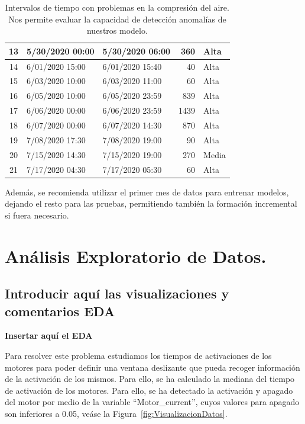 \documentclass[12pt,letterpaper]{article}
\begin{document}
\begin{table}[!ht]
\begin{tabular}{|c|l|l|r|l|}
13           & 5/30/2020 00:00          & 5/30/2020 06:00           & 360                & Alta              \\ \hline
14           & 6/01/2020 15:00          & 6/01/2020 15:40           & 40                 & Alta              \\ \hline
15           & 6/03/2020 10:00          & 6/03/2020 11:00           & 60                 & Alta              \\ \hline
16           & 6/05/2020 10:00          & 6/05/2020 23:59           & 839                & Alta              \\ \hline
17           & 6/06/2020 00:00          & 6/06/2020 23:59           & 1439               & Alta              \\ \hline
18           & 6/07/2020 00:00          & 6/07/2020 14:30           & 870                & Alta              \\ \hline
19           & 7/08/2020 17:30          & 7/08/2020 19:00           & 90                 & Alta              \\ \hline
20           & 7/15/2020 14:30          & 7/15/2020 19:00           & 270                & Media            \\ \hline
21           & 7/17/2020 04:30          & 7/17/2020 05:30           & 60                 & Alta              \\ \hline
\end{tabular}
    \caption{
    Intervalos de tiempo con problemas en la compresión del aire.
    Nos permite evaluar la capacidad de detección anomalías de nuestros modelo.}
    \label{tab:Reportes}
\end{table}

Además, se recomienda utilizar el primer mes de datos para entrenar modelos, dejando el resto para las pruebas, permitiendo también la formación incremental si fuera necesario.


\section{Análisis Exploratorio de Datos.}
\subsection{Introducir aquí las visualizaciones y comentarios EDA}
\textbf{Insertar aquí el EDA}

Para resolver este problema estudiamos los tiempos de activaciones de los motores para poder definir una ventana deslizante que pueda recoger información de la activación de los mismos. 
Para ello, se ha calculado la mediana del tiempo de activación de los motores. Para ello, se ha detectado la activación y apagado del motor por medio de la variable ``Motor\_current'', cuyos 
valores para apagado son inferiores a 0.05, veáse la Figura~\ref{fig:VisualizacionDatos}.
\end{document}
